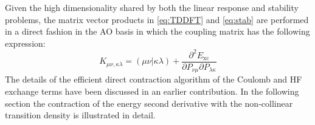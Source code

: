 \documentclass[12pt]{article}
\begin{document}
Given the high dimensionality shared by both the linear response and stability problems, the matrix vector products in \cref{eq:TDDFT} and \cref{eq:stab} are performed in a direct fashion in the AO basis in which the coupling matrix has the following expression: 
\begin{equation}
\label{eq:KAO}
 K_{\mu\nu,\kappa\lambda} = (\mu\nu\vert\kappa\lambda) + \frac{\partial^2 E_\mathrm{xc}}{\partial P_{\nu\mu}\partial P_{\lambda\kappa}}
\end{equation}
The details of the efficient direct contraction algorithm of the Coulomb and HF exchange terms have been discussed in an earlier contribution.\cite{Li16_3711}
In the following section the contraction of the energy second derivative with the non-collinear transition density is illustrated in detail.



\end{document}

